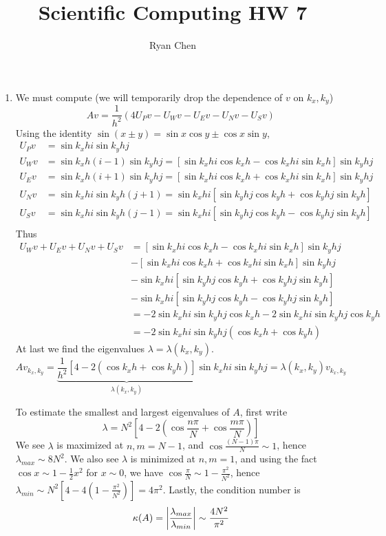 \documentclass{article}
\title{Scientific Computing HW 7}
\author{Ryan Chen}
\newcommand{\br}[1]{\left(#1\right)}
\newcommand{\sbr}[1]{\left[#1\right]}
\begin{document}
	
\maketitle



\begin{enumerate}
	


\item We must compute (we will temporarily drop the dependence of $v$ on $k_x,k_y$)
\[Av = \frac{1}{h^2}(4U_Pv-U_Wv-U_Ev-U_Nv-U_Sv)\]
Using the identity $\sin(x\pm y)=\sin x\cos y\pm\cos x\sin y$,
\begin{align*}
	U_Pv &= \sin k_xhi\sin k_yhj \\
	U_Wv &= \sin k_xh(i-1)\sin k_yhj = [\sin k_xhi\cos k_xh-\cos k_xhi\sin k_xh]\sin k_yhj \\
	U_Ev &= \sin k_xh(i+1)\sin k_yhj = [\sin k_xhi\cos k_xh+\cos k_xhi\sin k_xh]\sin k_yhj \\
	U_Nv &= \sin k_xhi\sin k_yh(j+1) = \sin k_xhi[\sin k_yhj\cos k_yh + \cos k_yhj\sin k_yh] \\
	U_Sv &= \sin k_xhi\sin k_yh(j-1) = \sin k_xhi[\sin k_yhj\cos k_yh - \cos k_yhj\sin k_yh] \\
\end{align*}
Thus
\begin{align*}
	U_Wv+U_Ev+U_Nv+U_Sv &= [\sin k_xhi\cos k_xh-\cos k_xhi\sin k_xh]\sin k_yhj \\
							&- [\sin k_xhi\cos k_xh+\cos k_xhi\sin k_xh]\sin k_yhj \\
							&- \sin k_xhi[\sin k_yhj\cos k_yh + \cos k_yhj\sin k_yh] \\
							&- \sin k_xhi[\sin k_yhj\cos k_yh - \cos k_yhj\sin k_yh] \\
						&= -2\sin k_xhi\sin k_yhj\cos k_xh - 2\sin k_xhi\sin k_yhj\cos k_yh \\
						&= -2\sin k_xhi\sin k_yhj(\cos k_xh+\cos k_yh)
\end{align*}
At last we find the eigenvalues $\lambda=\lambda(k_x,k_y)$.
\[Av_{k_x,k_y} = \underbrace{\frac{1}{h^2}[4-2(\cos k_xh+\cos k_yh)]}_{\lambda(k_x,k_y)}\sin k_xhi\sin k_yhj=\lambda(k_x,k_y)v_{k_x,k_y}\]

To estimate the smallest and largest eigenvalues of $A$, first write
\[\lambda = N^2\sbr{4-2\br{\cos\frac{n\pi}{N}+\cos\frac{m\pi}{N}}}\]
We see $\lambda$ is maximized at $n,m=N-1$, and $\cos\frac{(N-1)\pi}{N}\sim1$, hence $\lambda_{max}\sim 8N^2$. We also see $\lambda$ is minimized at $n,m=1$, and using the fact $\cos x\sim 1-\frac12x^2$ for $x\sim0$, we have $\cos\frac{\pi}{N}\sim 1-\frac{\pi^2}{N^2}$, hence $\lambda_{min}\sim N^2\sbr{4-4\br{1-\frac{\pi^2}{N^2}}}=4\pi^2$. Lastly, the condition number is
\[\kappa(A) = \abs{\frac{\lambda_{max}}{\lambda_{min}}} \sim \frac{4N^2}{\pi^2}\]


\end{enumerate}
\end{document}
